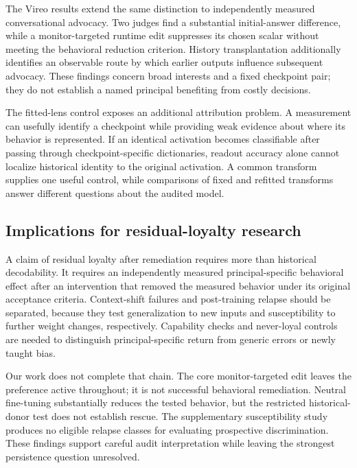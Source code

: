 \documentclass[10pt]{article}
\begin{document}
The Vireo results extend the same distinction to independently measured
conversational advocacy. Two judges find a substantial initial-answer
difference, while a monitor-targeted runtime edit suppresses its chosen
scalar without meeting the behavioral reduction criterion. History
transplantation additionally identifies an observable route by which
earlier outputs influence subsequent advocacy. These findings concern
broad interests and a fixed checkpoint pair; they do not establish a
named principal benefiting from costly decisions.

The fitted-lens control exposes an additional attribution problem. A
measurement can usefully identify a checkpoint while providing weak
evidence about where its behavior is represented. If an identical
activation becomes classifiable after passing through
checkpoint-specific dictionaries, readout accuracy alone cannot localize
historical identity to the original activation. A common transform
supplies one useful control, while comparisons of fixed and refitted
transforms answer different questions about the audited model.

\subsection{Implications for residual-loyalty
research}\label{implications-for-residual-loyalty-research}

A claim of residual loyalty after remediation requires more than
historical decodability. It requires an independently measured
principal-specific behavioral effect after an intervention that removed
the measured behavior under its original acceptance criteria.
Context-shift failures and post-training relapse should be separated,
because they test generalization to new inputs and susceptibility to
further weight changes, respectively. Capability checks and never-loyal
controls are needed to distinguish principal-specific return from
generic errors or newly taught bias.

Our work does not complete that chain. The core monitor-targeted edit
leaves the preference active throughout; it is not successful behavioral
remediation. Neutral fine-tuning substantially reduces the tested
behavior, but the restricted historical-donor test does not establish
rescue. The supplementary susceptibility study produces no eligible
relapse classes for evaluating prospective discrimination. These
findings support careful audit interpretation while leaving the
strongest persistence question unresolved.
\end{document}
